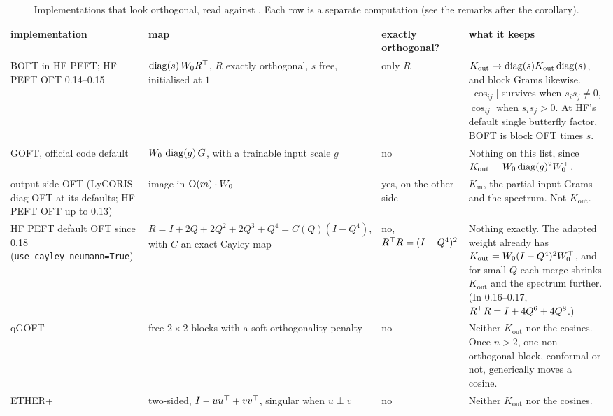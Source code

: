 \begin{table}[t]
\centering\footnotesize
\caption{Implementations that look orthogonal, read against . Each row is a separate computation
(see the remarks after the corollary).}
\label{tab:erlangen-orthogonal}
\begin{tabularx}{\linewidth}{@{}>{\raggedright\arraybackslash}p{2.9cm} >{\raggedright\arraybackslash}p{3.4cm}
  >{\raggedright\arraybackslash}p{1.7cm} >{\raggedright\arraybackslash}X@{}}
\toprule
\headrow \textbf{implementation} & \textbf{map} & \textbf{exactly orthogonal?} & \textbf{what it keeps}\\
\midrule
BOFT in HF PEFT; HF PEFT OFT 0.14--0.15 & $\operatorname{diag}(s)\,W_0R^{\top}$, $R$ exactly orthogonal, $s$ free, initialised at $1$ & only $R$
  & $K_{\mathrm{out}}\mapsto\operatorname{diag}(s)K_{\mathrm{out}}\operatorname{diag}(s)$, and block Grams likewise. $\lvert\cos_{ij}\rvert$
  survives when $s_is_j\ne0$, $\cos_{ij}$ when $s_is_j>0$. At HF's default single butterfly factor, BOFT is block OFT
  times $s$.\\
GOFT, official code default & $W_0\,\operatorname{diag}(g)\,G$, with a trainable input scale $g$ & no & Nothing on this list, since
  $K_{\mathrm{out}}=W_0\operatorname{diag}(g)^2W_0^{\top}$.\\
output-side OFT (LyCORIS diag-OFT at its defaults; HF PEFT OFT up to 0.13) & image in $\mathrm{O}(m)\cdot W_0$ & yes, on the
  other side & $K_{\mathrm{in}}$, the partial input Grams and the spectrum. Not $K_{\mathrm{out}}$.\\
HF PEFT default OFT since 0.18 (\texttt{use\_cayley\_\allowbreak neumann=True}) & $R=I+2Q+2Q^2+2Q^3+Q^4=C(Q)(I-Q^4)$, with $C$ an
  exact Cayley map & no, $R^{\top} R=(I-Q^4)^2$ & Nothing exactly. The adapted weight already has
  $K_{\mathrm{out}}=W_0(I-Q^4)^2W_0^{\top}$, and for small $Q$ each merge shrinks $K_{\mathrm{out}}$ and the spectrum
  further. (In 0.16--0.17, $R^{\top} R=I+4Q^6+4Q^8$.)\\
qGOFT & free $2\times2$ blocks with a soft orthogonality penalty & no & Neither $K_{\mathrm{out}}$ nor the cosines. Once
  $n>2$, one non-orthogonal block, conformal or not, generically moves a cosine.\\
ETHER+ & two-sided, $I-uu^{\top}+vv^{\top}$, singular when $u\perp v$ & no & Neither $K_{\mathrm{out}}$ nor the cosines.\\
\bottomrule
\end{tabularx}
\end{table}


